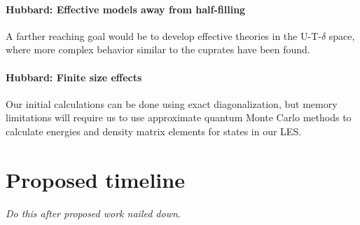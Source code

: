 \documentclass{article}
\begin{document}
\paragraph{Hubbard: Effective models away from half-filling} A farther reaching goal would be to develop effective theories in the U-T-$\delta$ space, where more complex behavior similar to the cuprates have been found.

\paragraph{Hubbard: Finite size effects} Our initial calculations can be done using exact diagonalization, but memory limitations will require us to use approximate quantum Monte Carlo methods to calculate energies and density matrix elements for states in our LES.


\section{Proposed timeline}
\textit{Do this after proposed work nailed down}.
\end{document}
